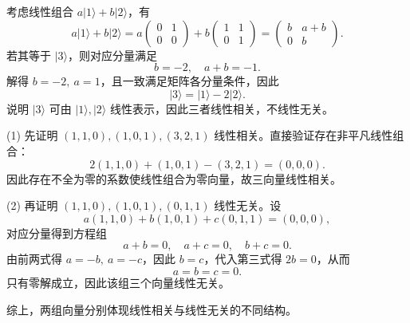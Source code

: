 \begin{solution}[2×2矩阵空间中的线性相关性]

\answer
考虑线性组合 $a|1\rangle+b|2\rangle$，有
\[
a|1\rangle+b|2\rangle
=
a\begin{pmatrix}0&1\\0&0\end{pmatrix}
+b\begin{pmatrix}1&1\\0&1\end{pmatrix}
=
\begin{pmatrix}b & a+b\\ 0 & b\end{pmatrix}.
\]
若其等于 $|3\rangle$，则对应分量满足
\[
b=-2,\quad a+b=-1.
\]
解得 $b=-2,\ a=1$，且一致满足矩阵各分量条件，因此
\[
|3\rangle = |1\rangle - 2|2\rangle.
\]
说明 $|3\rangle$ 可由 $|1\rangle,|2\rangle$ 线性表示，因此三者线性相关，不线性无关。
\end{solution}

\begin{solution}[向量线性相关与反例对比]

\answer
(1) 先证明 $(1,1,0),(1,0,1),(3,2,1)$ 线性相关。直接验证存在非平凡线性组合：
\[
2(1,1,0)+(1,0,1)-(3,2,1)=(0,0,0).
\]
因此存在不全为零的系数使线性组合为零向量，故三向量线性相关。

(2) 再证明 $(1,1,0),(1,0,1),(0,1,1)$ 线性无关。设
\[
a(1,1,0)+b(1,0,1)+c(0,1,1)=(0,0,0),
\]
对应分量得到方程组
\[
a+b=0,\quad a+c=0,\quad b+c=0.
\]
由前两式得 $a=-b,\ a=-c$，因此 $b=c$，代入第三式得 $2b=0$，从而
\[
a=b=c=0.
\]
只有零解成立，因此该组三个向量线性无关。

综上，两组向量分别体现线性相关与线性无关的不同结构。
\end{solution}